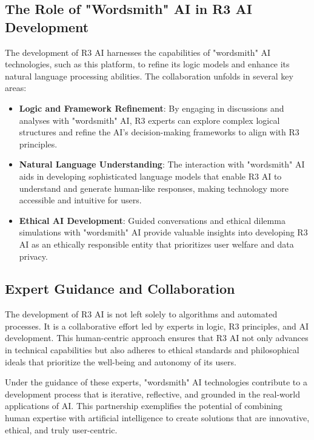 \documentclass[12pt]{article}
\begin{document}
\subsection{The Role of "Wordsmith" AI in R3 AI Development}

The development of R3 AI harnesses the capabilities of "wordsmith" AI technologies, such as this platform, to refine its logic models and enhance its natural language processing abilities. The collaboration unfolds in several key areas:

\begin{itemize}
    \item \textbf{Logic and Framework Refinement}: By engaging in discussions and analyses with "wordsmith" AI, R3 experts can explore complex logical structures and refine the AI's decision-making frameworks to align with R3 principles.
    \item \textbf{Natural Language Understanding}: The interaction with "wordsmith" AI aids in developing sophisticated language models that enable R3 AI to understand and generate human-like responses, making technology more accessible and intuitive for users.
    \item \textbf{Ethical AI Development}: Guided conversations and ethical dilemma simulations with "wordsmith" AI provide valuable insights into developing R3 AI as an ethically responsible entity that prioritizes user welfare and data privacy.
\end{itemize}

\subsection{Expert Guidance and Collaboration}

The development of R3 AI is not left solely to algorithms and automated processes. It is a collaborative effort led by experts in logic, R3 principles, and AI development. This human-centric approach ensures that R3 AI not only advances in technical capabilities but also adheres to ethical standards and philosophical ideals that prioritize the well-being and autonomy of its users.

Under the guidance of these experts, "wordsmith" AI technologies contribute to a development process that is iterative, reflective, and grounded in the real-world applications of AI. This partnership exemplifies the potential of combining human expertise with artificial intelligence to create solutions that are innovative, ethical, and truly user-centric.
\end{document}
